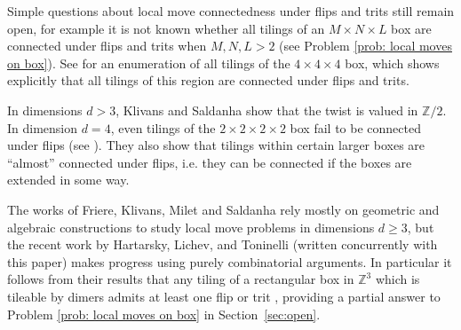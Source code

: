 \documentclass[11pt]{article}
\theoremstyle{remark}
\theoremstyle{definition}
\newcommand{\m}[1]{\mathbb{#1}}
\begin{document}
Simple questions about local move connectedness under flips and trits still remain open, for example it is not known whether all tilings of an $M\times N\times L$ box are connected under flips and trits when $M,N,L>2$ (see Problem \ref{prob: local moves on box}). See \cite{444box} for an enumeration of all tilings of the $4\times 4\times 4$ box, which shows explicitly that all tilings of this region are connected under flips and trits. 


In dimensions $d>3$, Klivans and Saldanha \cite{klivans2020domino} show that the twist is valued in $\m Z/2$. In dimension $d=4$, even tilings of the $2 \times 2 \times 2 \times 2$ box fail to be connected under flips (see \cite[Example 2.2]{klivans2020domino}). They also show that tilings within certain larger boxes are ``almost'' connected under flips, i.e. they can be connected if the boxes are extended in some way. 


The works of Friere, Klivans, Milet and Saldanha rely mostly on geometric and algebraic constructions to study local move problems in dimensions $d\geq 3$, but the recent work \cite{localdimer} by Hartarsky, Lichev, and Toninelli (written concurrently with this paper) makes progress using purely combinatorial arguments. In particular it follows from their results that any tiling of a rectangular box in $\m Z^3$ which is tileable by dimers admits at least one flip or trit \cite[Theorem 3]{localdimer}, providing a partial answer to Problem \ref{prob: local moves on box} in Section~\ref{sec:open}. 
\end{document}
